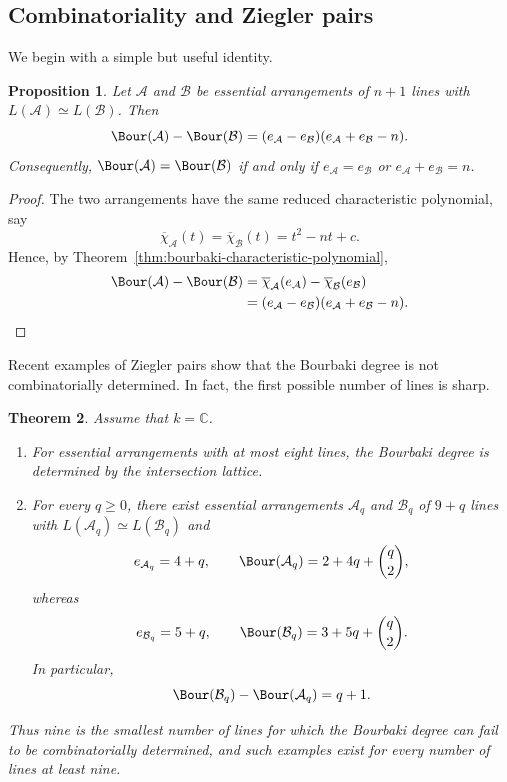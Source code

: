 \documentclass[11pt]{amsart}   %
\newtheorem{Theorem}{Theorem}[section]
\newtheorem{Proposition}[Theorem]{Proposition}
\theoremstyle{definition}
\def\NZQ{\mathbb}               %
\def\CC{{\NZQ C}}
\def\A{{\mathcal A}}
\def\B{{\mathcal B}}
\begin{document}
\subsection{Combinatoriality and Ziegler pairs}
\label{subsec:combinatoriality-bourbaki}

We begin with a simple but useful identity.

\begin{Proposition}
\label{prop:bourbaki-same-lattice}
Let $\A$ and $\B$ be essential arrangements of $n+1$ lines with $L(\A)\simeq L(\B)$. Then
\[
\Bour(\A)-\Bour(\B)
=
(e_\A-e_\B)(e_\A+e_\B-n).
\]
Consequently, $\Bour(\A)=\Bour(\B)$ if and only if $e_\A=e_\B$ or $e_\A+e_\B=n$.
\end{Proposition}

\begin{proof}
The two arrangements have the same reduced characteristic polynomial, say
\[
\overline{\chi}_\A(t)
=
\overline{\chi}_\B(t)
=
t^2-nt+c.
\]
Hence, by Theorem~\ref{thm:bourbaki-characteristic-polynomial},
\[
\begin{aligned}
\Bour(\A)-\Bour(\B)
&=
\overline{\chi}_\A(e_\A)
-\overline{\chi}_\B(e_\B)\\ &= (e_\A-e_\B)(e_\A+e_\B-n).
\end{aligned}
\]
\end{proof}

Recent examples of Ziegler pairs show that the Bourbaki degree is not combinatorially determined. In fact, the first possible number of lines is sharp.

\begin{Theorem}
\label{thm:sharp-combinatorial-threshold}
Assume that $k=\CC$.
\begin{enumerate}
\item For essential arrangements with at most eight lines, the
Bourbaki degree is determined by the intersection lattice.

\item For every $q\geq0$, there exist essential arrangements
$\A_q$ and $\B_q$ of $9+q$ lines with $L(\A_q)\simeq L(\B_q)$ and
\[
e_{\A_q}=4+q,
\qquad
\Bour(\A_q)=2+4q+\binom q2,
\]
whereas
\[
e_{\B_q}=5+q,
\qquad
\Bour(\B_q)=3+5q+\binom q2.
\]
In particular,
\[
\Bour(\B_q)-\Bour(\A_q)=q+1.
\]
\end{enumerate}
Thus nine is the smallest number of lines for which the Bourbaki degree can fail to be combinatorially determined, and such examples exist for every number of lines at least nine.
\end{Theorem}
\end{document}
